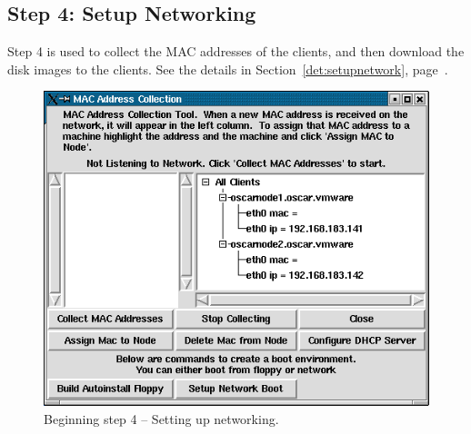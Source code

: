 
\subsection{Step 4: Setup Networking}

Step 4 is used to collect the MAC addresses of the clients, and then
download the disk images to the clients.  See the details in
Section~\ref{det:setupnetwork}, page~\pageref{det:setupnetwork}.

\begin{figure}[h!]
  \begin{center}
    \centerline{\includegraphics[scale=\imgscale]{figs/6a_sbs-collect-mac1}}
    \caption{Beginning step 4 -- Setting up networking.}
    \label{fig:sbs-setup-network1}
  \end{center}
\end{figure}


